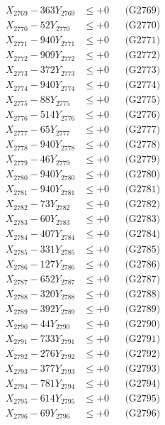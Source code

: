 \documentclass[a4paper,10pt]{article}
\begin{document}
{\begin{align}
X_{2769} - 363Y_{2769} &\leq +0 && \text{(G2769)} \\
X_{2770} - 52Y_{2770} &\leq +0 && \text{(G2770)} \\
\allowbreak
X_{2771} - 940Y_{2771} &\leq +0 && \text{(G2771)} \\
X_{2772} - 909Y_{2772} &\leq +0 && \text{(G2772)} \\
X_{2773} - 372Y_{2773} &\leq +0 && \text{(G2773)} \\
X_{2774} - 940Y_{2774} &\leq +0 && \text{(G2774)} \\
X_{2775} - 88Y_{2775} &\leq +0 && \text{(G2775)} \\
X_{2776} - 514Y_{2776} &\leq +0 && \text{(G2776)} \\
X_{2777} - 65Y_{2777} &\leq +0 && \text{(G2777)} \\
X_{2778} - 940Y_{2778} &\leq +0 && \text{(G2778)} \\
X_{2779} - 46Y_{2779} &\leq +0 && \text{(G2779)} \\
X_{2780} - 940Y_{2780} &\leq +0 && \text{(G2780)} \\
\allowbreak
X_{2781} - 940Y_{2781} &\leq +0 && \text{(G2781)} \\
X_{2782} - 73Y_{2782} &\leq +0 && \text{(G2782)} \\
X_{2783} - 60Y_{2783} &\leq +0 && \text{(G2783)} \\
X_{2784} - 407Y_{2784} &\leq +0 && \text{(G2784)} \\
X_{2785} - 331Y_{2785} &\leq +0 && \text{(G2785)} \\
X_{2786} - 127Y_{2786} &\leq +0 && \text{(G2786)} \\
X_{2787} - 652Y_{2787} &\leq +0 && \text{(G2787)} \\
X_{2788} - 320Y_{2788} &\leq +0 && \text{(G2788)} \\
X_{2789} - 392Y_{2789} &\leq +0 && \text{(G2789)} \\
X_{2790} - 44Y_{2790} &\leq +0 && \text{(G2790)} \\
\allowbreak
X_{2791} - 733Y_{2791} &\leq +0 && \text{(G2791)} \\
X_{2792} - 276Y_{2792} &\leq +0 && \text{(G2792)} \\
X_{2793} - 377Y_{2793} &\leq +0 && \text{(G2793)} \\
X_{2794} - 781Y_{2794} &\leq +0 && \text{(G2794)} \\
X_{2795} - 614Y_{2795} &\leq +0 && \text{(G2795)} \\
X_{2796} - 69Y_{2796} &\leq +0 && \text{(G2796)} \\

\end{align}}
\end{document}
